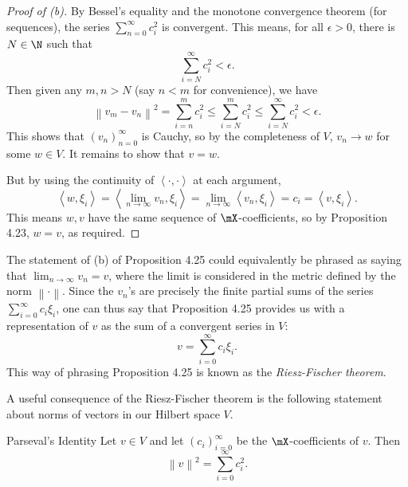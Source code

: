 \documentclass[pmath450]{subfiles}
\begin{document}
    \begin{proof}[Proof of (b)]
        By Bessel's equality and the monotone convergence theorem (for sequences), the series $\sum^{\infty}_{n=0}c_i^{2}$ is convergent. This means, for all $\epsilon>0$, there is $N\in\N$ such that
        \begin{equation*}
            \sum^{\infty}_{i=N} c_i^{2} < \epsilon.
        \end{equation*}
        Then given any $m,n>N$ (say $n<m$ for convenience), we have
        \begin{equation*}
            \left\lVert v_m-v_n\right\rVert^{2} = \sum^{m}_{i=n} c_i^{2} \leq \sum^{m}_{i=N} c_i^{2} \leq \sum^{\infty}_{i=N} c_i^{2} < \epsilon.
        \end{equation*}
        This shows that $\left( v_{n} \right)^{\infty}_{n=0}$ is Cauchy, so by the completeness of $V$, $v_n\to w$ for some $w\in V$. It remains to show that $v=w$.

        But by using the continuity of $\left\langle \cdot, \cdot\right\rangle$ at each argument,
        \begin{equation*}
            \left\langle w, \xi_i\right\rangle = \left\langle \lim_{n\to\infty}v_n, \xi_i\right\rangle = \lim_{n\to\infty}\left\langle v_n, \xi_i\right\rangle = c_i = \left\langle v, \xi_i\right\rangle.
        \end{equation*}
        This means $w,v$ have the same sequence of $\mX$-coefficients, so by Proposition 4.23, $w=v$, as required.
    \end{proof}

    \np The statement of (b) of Proposition 4.25 could equivalently be phrased as saying that $\lim_{n\to\infty}v_n=v$, where the limit is considered in the metric defined by the norm $\left\lVert \cdot\right\rVert$. Since the $v_n$'s are precisely the finite partial sums of the series $\sum^{\infty}_{i=0}c_i\xi_i$, one can thus say that Proposition 4.25 provides us with a representation of $v$ as the sum of a convergent series in $V$:
    \begin{equation*}
        v = \sum^{\infty}_{i=0}c_i\xi_i.
    \end{equation*}
    This way of phrasing Proposition 4.25 is known as the \textit{Riesz-Fischer theorem}.

    A useful consequence of the Riesz-Fischer theorem is the following statement about norms of vectors in our Hilbert space $V$.

    \begin{prop}{Parseval's Identity}
        Let $v\in V$ and let $\left( c_{i} \right)^{\infty}_{i=0}$ be the $\mX$-coefficients of $v$. Then
        \begin{equation*}
            \left\lVert v\right\rVert^{2} = \sum^{\infty}_{i=0}c_i^{2}.
        \end{equation*}
    \end{prop}
    
\end{document}
